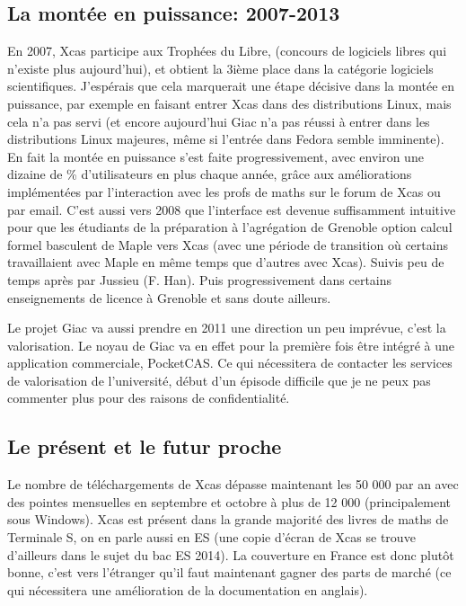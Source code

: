 \documentclass[a4paper,11pt]{article}
\begin{document}
\begin{giacjshere}
\subsection{La mont\'ee en puissance: 2007-2013}
En 2007, Xcas participe aux Troph\'ees du Libre, (concours
de logiciels libres qui n'existe plus aujourd'hui), et obtient
la 3i\`eme place dans la cat\'egorie logiciels scientifiques.
J'esp\'erais que cela marquerait une \'etape
d\'ecisive dans la mont\'ee en puissance,
par exemple en faisant entrer Xcas dans
des distributions Linux, mais cela n'a pas servi (et encore
aujourd'hui Giac n'a pas r\'eussi \`a entrer dans les distributions
Linux majeures, m\^eme si l'entr\'ee dans Fedora semble
imminente). En fait la mont\'ee en puissance s'est faite
progressivement, avec environ une dizaine de \% d'utilisateurs
en plus chaque ann\'ee, gr\^ace aux am\'eliorations
impl\'ement\'ees par l'interaction avec les profs
de maths sur le forum de Xcas ou par email. C'est aussi
vers 2008 que l'interface est devenue suffisamment
intuitive pour que les \'etudiants de la pr\'eparation
\`a l'agr\'egation de Grenoble option calcul formel
basculent de Maple vers Xcas
(avec une p\'eriode de transition o\`u certains travaillaient
avec Maple en m\^eme temps que d'autres avec Xcas). Suivis
peu de temps apr\`es par Jussieu (F. Han). Puis progressivement
dans certains enseignements de licence \`a Grenoble et
sans doute ailleurs.

Le projet Giac va aussi prendre en 2011 une direction un peu
impr\'evue, c'est la valorisation. Le noyau de Giac va
en effet pour la premi\`ere fois \^etre int\'egr\'e
\`a une application commerciale, PocketCAS. Ce qui n\'ecessitera
de contacter les services de valorisation de l'universit\'e, d\'ebut d'un \'episode
difficile que je ne peux pas commenter plus pour des
raisons de confidentialit\'e.

\subsection{Le pr\'esent et le futur proche}
Le nombre de t\'el\'echargements de Xcas d\'epasse maintenant
les 50 000 par an avec des pointes mensuelles en septembre et octobre
\`a plus de 12 000 (principalement sous Windows). Xcas est
pr\'esent dans la grande majorit\'e des livres de maths de Terminale
S, on en parle aussi en ES (une copie d'\'ecran de Xcas se trouve
d'ailleurs dans le sujet du bac ES 2014).
La couverture en France est donc plut\^ot bonne, c'est
vers l'\'etranger qu'il faut maintenant gagner des parts de march\'e
(ce qui n\'ecessitera une am\'elioration de la documentation
en anglais).


\end{giacjshere}
\end{document}

